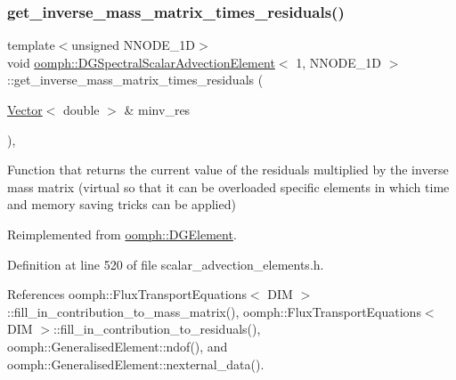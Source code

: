 \subsubsection{\texorpdfstring{get\+\_\+inverse\+\_\+mass\+\_\+matrix\+\_\+times\+\_\+residuals()}{get\_inverse\_mass\_matrix\_times\_residuals()}}
{\footnotesize\ttfamily template$<$unsigned N\+N\+O\+D\+E\+\_\+1D$>$ \\
void \hyperlink{classoomph_1_1DGSpectralScalarAdvectionElement}{oomph\+::\+D\+G\+Spectral\+Scalar\+Advection\+Element}$<$ 1, N\+N\+O\+D\+E\+\_\+1D $>$\+::get\+\_\+inverse\+\_\+mass\+\_\+matrix\+\_\+times\+\_\+residuals (\begin{DoxyParamCaption}\item[{\hyperlink{classoomph_1_1Vector}{Vector}$<$ double $>$ \&}]{minv\+\_\+res }\end{DoxyParamCaption})\hspace{0.3cm}{\ttfamily [inline]}, {\ttfamily [virtual]}}

Function that returns the current value of the residuals multiplied by the inverse mass matrix (virtual so that it can be overloaded specific elements in which time and memory saving tricks can be applied) 

Reimplemented from \hyperlink{classoomph_1_1DGElement_ad2247a9d65eb229dbf30d709c7b28d6d}{oomph\+::\+D\+G\+Element}.



Definition at line 520 of file scalar\+\_\+advection\+\_\+elements.\+h.



References oomph\+::\+Flux\+Transport\+Equations$<$ D\+I\+M $>$\+::fill\+\_\+in\+\_\+contribution\+\_\+to\+\_\+mass\+\_\+matrix(), oomph\+::\+Flux\+Transport\+Equations$<$ D\+I\+M $>$\+::fill\+\_\+in\+\_\+contribution\+\_\+to\+\_\+residuals(), oomph\+::\+Generalised\+Element\+::ndof(), and oomph\+::\+Generalised\+Element\+::nexternal\+\_\+data().

\mbox{\label{classoomph_1_1DGSpectralScalarAdvectionElement_3_011_00_01NNODE__1D_01_4_a0966bfa51ec4e244580be3212c1db919}} 
